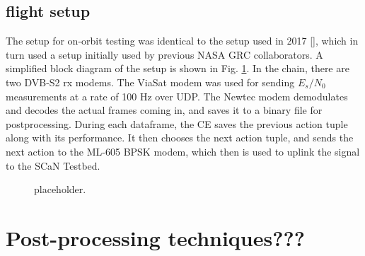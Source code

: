 \subsection{flight setup}
\par The setup for on-orbit testing was identical to the setup used in 2017 [\cite{tim_implementation}], which in turn used a setup initially used by previous NASA GRC collaborators. A simplified block diagram of the setup is shown in Fig. \ref{methods:flightTestFig}. In the chain, there are two DVB-S2 rx modems. The ViaSat modem was used for sending $E_s/N_0$ measurements at a rate of 100 Hz over UDP. The Newtec modem demodulates and decodes the actual frames coming in, and saves it to a binary file for postprocessing. During each dataframe, the CE saves the previous action tuple along with its performance. It then chooses the next action tuple, and sends the next action to the ML-605 BPSK modem, which then is used to uplink the signal to the SCaN Testbed.

\begin{figure}[ht]
\label{methods:flightTestFig}
\caption{placeholder.}
\end{figure} 

\section{Post-processing techniques???}

